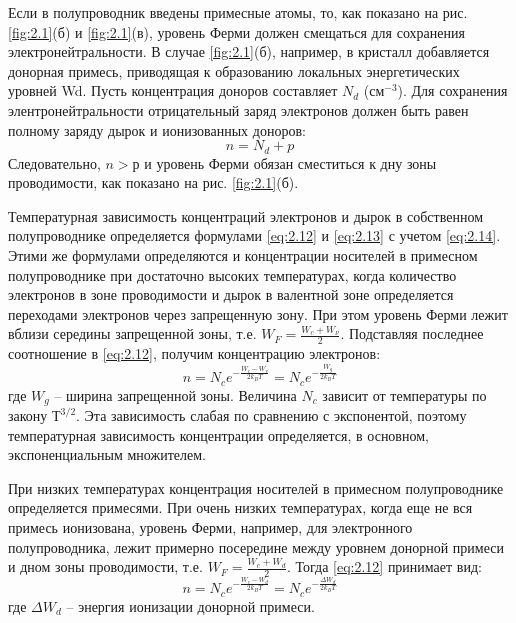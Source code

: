 		Если в полупроводник введены примесные атомы, то, как показано на рис. \ref{fig:2.1}(б) и \ref{fig:2.1}(в), уровень Ферми должен смещаться для
		сохранения электронейтральности. В случае \ref{fig:2.1}(б), например, в кристалл добавляется донорная примесь, приводящая к
		образованию локальных энергетических уровней Wd. Пусть концентрация доноров составляет $N_d$ (см$^{-3}$). Для сохранения
		элентронейтральности отрицательный заряд электронов должен быть равен полному заряду дырок и ионизованных доноров:
		\begin{equation}
		n = N_d+p
		\label{eq:2.15}
		\end{equation}
		Следовательно, $n>р$ и уровень Ферми обязан сместиться к дну зоны проводимости, как показано на рис. \ref{fig:2.1}(б).
		
		Температурная зависимость концентраций электронов и дырок в собственном полупроводнике определяется формулами \eqref{eq:2.12} и \eqref{eq:2.13} с учетом
		\eqref{eq:2.14}. Этими же формулами определяются и концентрации носителей в примесном полупроводнике при достаточно высоких
		температурах, когда количество электронов в зоне проводимости и дырок в валентной зоне определяется переходами
		электронов через запрещенную зону. При этом уровень Ферми лежит вблизи середины запрещенной зоны, т.е. $W_F =
		\frac{W_c+W_{\nu}}{2}$. Подставляя последнее соотношение в \eqref{eq:2.12}, получим концентрацию электронов:
		\begin{equation}
		n=N_{c} e^{-\frac{W_{c}-W_{v}}{2 k_{B} T}}=N_{c} e^{-\frac{W_{g}}{2 k_{B} T}}
		\label{eq:2.16}
		\end{equation}
		где $W_g$  – ширина запрещенной зоны. Величина $N_c$ зависит от температуры по закону $Т^{3/2}$. Эта зависимость слабая по
		сравнению с экспонентой, поэтому температурная зависимость концентрации определяется, в основном, экспоненциальным
		множителем. 
		
		При низких температурах концентрация носителей в примесном полупроводнике определяется примесями. При очень низких
		температурах, когда еще не вся примесь ионизована, уровень Ферми, например, для электронного полупроводника, лежит
		примерно посередине между уровнем донорной примеси и дном зоны проводимости, т.е. $W_F = \frac{W_c+W_{d}}{2}$. Тогда \eqref{eq:2.12}
		принимает вид: 
		\begin{equation}
		n=N_{c} e^{-\frac{W_{c}-W_{d}}{2 k_{B} T}}=N_{c} e^{-\frac{\Delta W_{d}}{2 k_{B} T}}
		\label{eq:2.17}
		\end{equation}
		где $\Delta W_d$ – энергия ионизации донорной примеси. 
		
